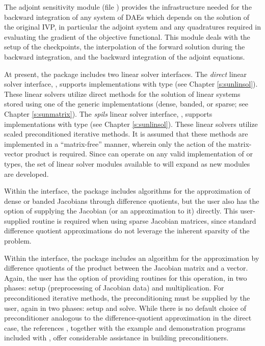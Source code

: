 The adjoint sensitivity module (file ) provides the infrastructure needed for the 
backward integration of any system of DAEs which depends on the solution 
of the original IVP, in particular the adjoint system and any quadratures required
in evaluating the gradient of the objective functional.  This module deals with
the setup of the checkpoints, the interpolation of the forward solution during
the backward integration, and the backward integration of the adjoint equations.

At present, the package includes two linear solver interfaces.  The
{\em direct} linear solver interface, {\idadls}, supports {\sunlinsol}
implementations with type  (see Chapter
\ref{s:sunlinsol}).  These linear solvers utilize direct methods for
the solution of linear systems stored using one of the {\sundials} generic
{\sunmatrix} implementations (dense, banded, or sparse; see
Chapter \ref{s:sunmatrix}).  
The {\em spils} linear solver interface, {\idaspils}, supports
{\sunlinsol} implementations with type 
(see Chapter \ref{s:sunlinsol}).  These linear solvers utilize scaled
preconditioned iterative methods.  It is assumed that these methods
are implemented in a ``matrix-free'' manner, wherein only the action
of the matrix-vector product is required.  Since {\idas} can
operate on any valid {\sunlinsol} implementation of
 or  types, the set of
linear solver modules available to {\idas} will expand as new
{\sunlinsol} modules are developed.

Within the {\idadls} interface, the package includes algorithms for the
approximation of dense or banded Jacobians through difference 
quotients, but the user also has the option of supplying the Jacobian
(or an approximation to it) directly.  This user-supplied 
routine is required when using sparse Jacobian matrices, since
standard difference quotient approximations do not leverage the
inherent sparsity of the problem.

Within the {\idaspils} interface, the package includes an algorithm for
the approximation by difference quotients of the product between the Jacobian
matrix and a vector. Again,
the user has the option of providing routines for this operation, in
two phases: setup (preprocessing of Jacobian data) and multiplication.
For preconditioned iterative methods,  
the preconditioning must be supplied by the user, again in two phases: 
setup and solve.  While there is no
default choice of preconditioner analogous to the difference-quotient
approximation in the direct case, the references
\cite{BrHi:89,Byr:92}, together with the example and demonstration
programs included with {\idas}, offer considerable assistance in
building preconditioners. 

